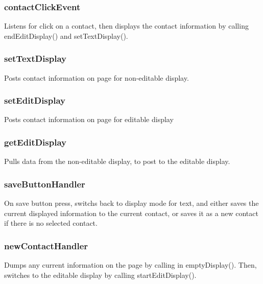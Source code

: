 \documentclass{article}
\begin{document}
\subsubsection{contactClickEvent}
Listens for click on a contact, then displays the contact information by calling endEditDisplay() and setTextDisplay().

\subsubsection{setTextDisplay}
Posts contact information on page for non-editable display.

\subsubsection{setEditDisplay}
Posts contact information on page for editable display

\subsubsection{getEditDisplay}
Pulls data from the non-editable display, to post to the editable display.

\subsubsection{saveButtonHandler}
On save button press, switchs back to display mode for text, and either saves the current displayed information to the current contact, or saves it as a new contact if there is no selected contact.

\subsubsection{newContactHandler}
Dumps any current information on the page by calling in emptyDisplay(). Then, switches to the editable display by calling startEditDisplay().
\end{document}
